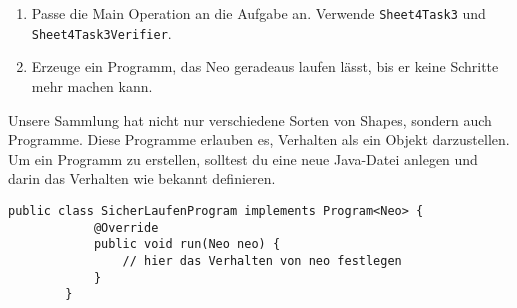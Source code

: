 
\begin{enumerate}
	\item Passe die Main Operation an die Aufgabe an.
		Verwende \lstinline{Sheet4Task3} und \lstinline{Sheet4Task3Verifier}.
	\item Erzeuge ein Programm, das Neo geradeaus laufen lässt, bis er keine Schritte mehr machen kann.
\end{enumerate}

\begin{Infobox}[Programme]
	Unsere Sammlung hat nicht nur verschiedene Sorten von Shapes, sondern auch Programme.
	Diese Programme erlauben es, Verhalten als ein Objekt darzustellen.
	Um ein Programm zu erstellen, solltest du eine neue Java-Datei anlegen und darin das Verhalten wie bekannt definieren.

	\begin{lstlisting}[title=SicherLaufenProgram.java]
		public class SicherLaufenProgram implements Program<Neo> {
			@Override
			public void run(Neo neo) {
				// hier das Verhalten von neo festlegen
			}
		}
	\end{lstlisting}

	
\end{Infobox}
